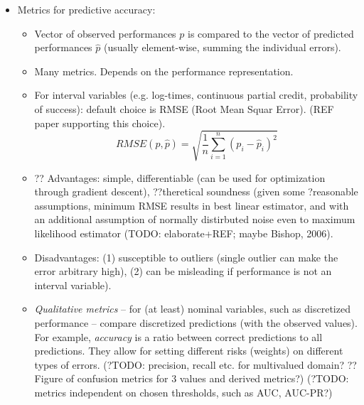 \begin{itemize}
\item Metrics for predictive accuracy:
\begin{itemize}
\item Vector of observed performances $p$ is compared to the vector of predicted performances $\hat{p}$ (usually element-wise, summing the individual errors).
\item Many metrics. Depends on the performance representation.
\item For interval variables
  (e.g. log-times, continuous partial credit, probability of success):
  default choice is RMSE (Root Mean Squar Error). (REF paper supporting this choice).
  $$
  RMSE(p, \hat{p}) = \sqrt{\frac{1}{n} \sum_{i=1}^n (p_i - \hat{p}_i)^2}
  $$
\item ?? Advantages:
  simple,
  differentiable (can be used for optimization through gradient descent),
  ??theretical soundness (given some ?reasonable assumptions, minimum RMSE results in
  best linear estimator, and with an additional assumption of normally distirbuted noise
  even to maximum likelihood estimator (TODO: elaborate+REF; maybe Bishop, 2006).
\item Disadvantages:
  (1) susceptible to outliers (single outlier can make the error arbitrary high),
  (2) can be misleading if performance is not an interval variable).
\item \emph{Qualitative metrics}
  -- for (at least) nominal variables, such as discretized performance
  -- compare discretized predictions (with the observed values).
  For example, \emph{accuracy} is a ratio between correct predictions to all predictions.
  They allow for setting different risks (weights) on different types of errors.
  (?TODO: precision, recall etc. for multivalued domain?
    ?? Figure of confusion metrics for 3 values and derived metrics?)
  (?TODO: metrics independent on chosen thresholds, such as AUC, AUC-PR?)

\end{itemize}
\end{itemize}
